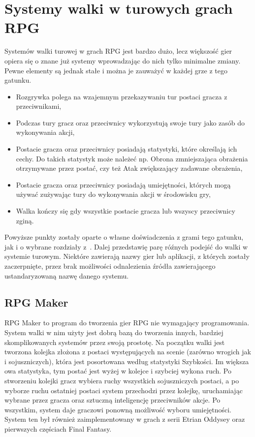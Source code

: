 \documentclass{SGGW-thesis}
\begin{document}
\section{Systemy walki w turowych grach RPG}
Systemów walki turowej w grach RPG jest bardzo dużo, lecz większość gier opiera się o znane już systemy wprowadzając do nich tylko minimalne zmiany. Pewne elementy są jednak stałe i można je zauważyć w każdej grze z tego gatunku.
\begin{itemize}
  \item{Rozgrywka polega na wzajemnym przekazywaniu tur postaci gracza z przeciwnikami},
  \item{Podczas tury gracz oraz przeciwnicy wykorzystują swoje tury jako zasób do wykonywania akcji},
  \item{Postacie gracza oraz przeciwnicy posiadają statystyki, które określają ich cechy. Do takich statystyk może należeć np. Obrona zmniejszająca obrażenia otrzymywane przez postać, czy też Atak zwiększający zadawane obrażenia},
  \item{Postacie gracza oraz przeciwnicy posiadają umiejętności, których mogą używać zużywając tury do wykonywania akcji w środowisku gry},
  \item{Walka kończy się gdy wszystkie postacie gracza lub wszyscy przeciwnicy zginą}.
\end{itemize}
Powyższe punkty zostały oparte o własne doświadczenia z grami tego gatunku, jak i o wybrane rozdziały z~\cite{RLLearningInTBRPG, PlayerPreferencesInRPGs}. Dalej przedstawię parę róźnych podejść do walki w systemie turowym. 
Niektóre zawierają nazwy gier lub aplikacji, z których zostały zaczerpnięte, przez brak możliwości odnalezienia źródła zawierającego ustandaryzowaną nazwę danego systemu.
\subsection{RPG Maker}
RPG Maker to program do tworzenia gier RPG nie wymagający programowania. System walki w nim użyty jest dobrą bazą do tworzenia innych, 
bardziej skomplikowanych systemów przez swoją prostotę. Na początku walki jest tworzona kolejka złożona z postaci występujących na scenie 
(zarówno wrogich jak i sojuszniczych), która jest posortowana według statystyki Szybkości. Im większa owa statystyka, tym postać jest wyżej w 
kolejce i szybciej wykona ruch. Po stworzeniu kolejki gracz wybiera ruchy wszystkich sojuszniczych postaci, a po wyborze ruchu ostatniej postaci
system przechodzi przez kolejkę, uruchamiając wybrane przez gracza oraz sztuczną inteligencję przeciwników akcje. Po wszystkim, 
system daje graczowi ponowną możliwość wyboru umiejętności. System ten był również zaimplementowany w grach z serii Etrian Oddysey oraz 
pierwszych częściach Final Fantasy.
\end{document}
